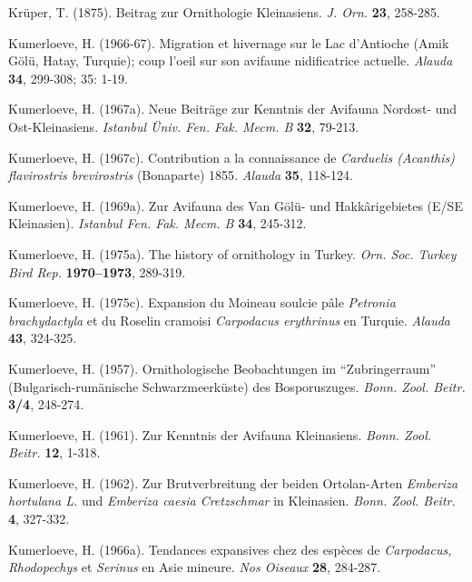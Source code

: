 \documentclass[
  10.5pt,
  a4paper,
  DIV=11,
  numbers=noendperiod,
  twocolumn]{scrreprt}
\newlength{\cslhangindent}
\newenvironment{CSLReferences}[2] %
 {\begin{list}{}{%
  \setlength{\itemindent}{0pt}
  \setlength{\leftmargin}{0pt}
  \setlength{\parsep}{0pt}
  \ifodd #1
   \setlength{\leftmargin}{\cslhangindent}
   \setlength{\itemindent}{-1\cslhangindent}
  \fi
  \setlength{\itemsep}{#2\baselineskip}}}
 {\end{list}}
\begin{document}
\begin{CSLReferences}{1}{1}
Krüper, T. (1875). {Beitrag zur Ornithologie Kleinasiens}. \emph{J.
Orn.} \textbf{23}, 258-285.

Kumerloeve, H. (1966-67). {Migration et hivernage sur le Lac d'Antioche
(Amik Gölü, Hatay, Turquie); coup l'oeil sur son avifaune nidificatrice
actuelle}. \emph{Alauda} \textbf{34}, 299-308; 35: 1-19.

Kumerloeve, H. (1967a). {Neue Beiträge zur Kenntnis der Avifauna
Nordost- und Ost-Kleinasiens}. \emph{Istanbul Üniv. Fen. Fak. Mecm. B}
\textbf{32}, 79-213.

Kumerloeve, H. (1967c). {Contribution a la connaissance de
\emph{Carduelis (Acanthis) flavirostris brevirostris} (Bonaparte) 1855}.
\emph{Alauda} \textbf{35}, 118-124.

Kumerloeve, H. (1969a). {Zur Avifauna des Van Gölü- und Hakkârigebietes
(E/SE Kleinasien)}. \emph{Istanbul Fen. Fak. Mecm. B} \textbf{34},
245-312.

Kumerloeve, H. (1975a). {The history of ornithology in Turkey}.
\emph{Orn. Soc. Turkey Bird Rep.} \textbf{1970--1973}, 289-319.

Kumerloeve, H. (1975c). {Expansion du Moineau soulcie pâle
\emph{Petronia brachydactyla} et du Roselin cramoisi \emph{Carpodacus
erythrinus} en Turquie}. \emph{Alauda} \textbf{43}, 324-325.

Kumerloeve, H. (1957). {Ornithologische Beobachtungen im
{``Zubringerraum''} (Bulgarisch-rumänische Schwarzmeerküste) des
Bosporuszuges}. \emph{Bonn. Zool. Beitr.} \textbf{3/4}, 248-274.

Kumerloeve, H. (1961). {Zur Kenntnis der Avifauna Kleinasiens}.
\emph{Bonn. Zool. Beitr.} \textbf{12}, 1-318.

Kumerloeve, H. (1962). {Zur Brutverbreitung der beiden Ortolan-Arten
\emph{Emberiza hortulana L.} und \emph{Emberiza caesia Cretzschmar} in
Kleinasien}. \emph{Bonn. Zool. Beitr.} \textbf{4}, 327-332.

Kumerloeve, H. (1966a). {Tendances expansives chez des espèces de
\emph{Carpodacus, Rhodopechys} et \emph{Serinus} en Asie mineure}.
\emph{Nos Oiseaux} \textbf{28}, 284-287.


\end{CSLReferences}
\end{document}
